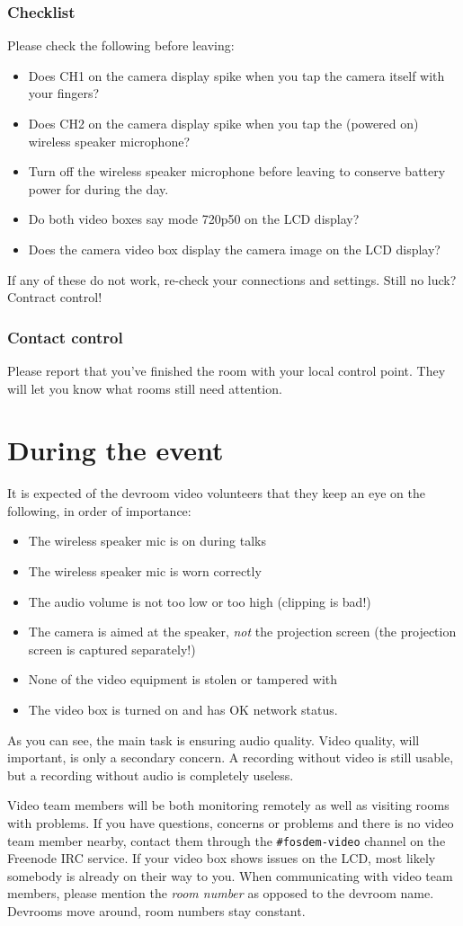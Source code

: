 \documentclass{article}
\begin{document}
\subsubsection{Checklist}
Please check the following before leaving:
\begin{itemize}
  \item Does CH1 on the camera display spike when you tap the camera itself with your fingers?
  \item Does CH2 on the camera display spike when you tap the (powered on) wireless speaker microphone?
  \item Turn off the wireless speaker microphone before leaving to conserve battery power for during the day.
  \item Do both video boxes say mode 720p50 on the LCD display?
  \item Does the camera video box display the camera image on the LCD display?
\end{itemize}

If any of these do not work, re-check your connections and settings. Still no luck? Contract control!

\subsubsection{Contact control}
Please report that you've finished the room with your local control point.
They will let you know what rooms still need attention.

\section{During the event}
It is expected of the devroom video volunteers that they keep an eye on the following, in order of importance:
\begin{itemize}
  \item The wireless speaker mic is on during talks
  \item The wireless speaker mic is worn correctly
  \item The audio volume is not too low or too high (clipping is bad!)
  \item The camera is aimed at the speaker, \emph{not} the projection screen (the projection screen is captured separately!)
  \item None of the video equipment is stolen or tampered with
  \item The video box is turned on and has OK network status.
\end{itemize}
As you can see, the main task is ensuring audio quality. Video quality, will important, is only a secondary concern. A recording without video is still usable, but a recording without audio is completely useless.

Video team members will be both monitoring remotely as well as visiting rooms with problems. If you have questions, concerns or problems and there is no video team member nearby, contact them through the \texttt{\#fosdem-video} channel on the Freenode IRC service. If your video box shows issues on the LCD, most likely somebody is already on their way to you. When communicating with video team members, please mention the \emph{room number} as opposed to the devroom name. Devrooms move around, room numbers stay constant.
\end{document}
